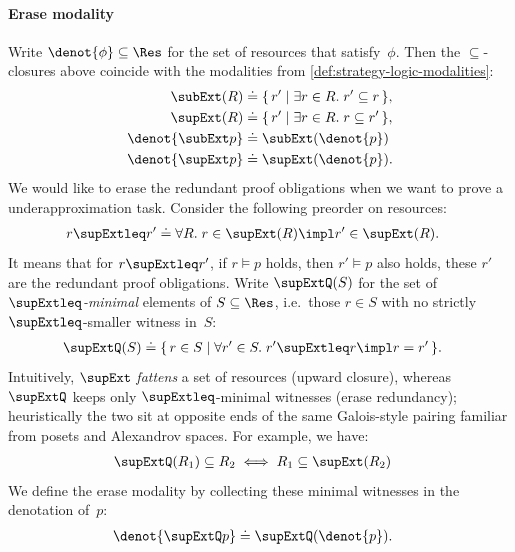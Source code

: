\paragraph{Erase modality}
Write $\denot{\phi} \subseteq \Res$ for the set of resources that satisfy~$\phi$.
Then the $\subseteq$-closures above coincide with the modalities from \autoref{def:strategy-logic-modalities}:
\begin{align*}
  \subExt(R) &\doteq \{\, r' \mid \exists r \in R.\; r' \subseteq r \,\},
  \\
  \supExt(R) &\doteq \{\, r' \mid \exists r \in R.\; r \subseteq r' \,\},
  \\
  \denot{\subExt p} &\doteq \subExt(\denot{p}) \\
  \denot{\supExt p} &\doteq \supExt(\denot{p}).
\end{align*}
We would like to erase the redundant proof obligations when we want to prove a underapproximation task.
Consider the following preorder on resources:
\begin{align*}
  r \supExtleq r' &\doteq \forall R.\; r \in \supExt(R) \impl r' \in \supExt(R).
\end{align*}
It means that for $r \supExtleq r'$, if $r \models p$ holds, then $r' \models p$ also holds, these $r'$ are the redundant proof obligations.
Write $\supExtQ(S)$ for the set of \emph{$\supExtleq$-minimal} elements of $S \subseteq \Res$, i.e.\ those $r \in S$ with no strictly $\supExtleq$-smaller witness in~$S$:
\begin{align*}
  \supExtQ(S) &\doteq
  \{\, r \in S \mid \forall r' \in S.\; r' \supExtleq r \impl r = r' \,\}.
\end{align*}
Intuitively, $\supExt$ \emph{fattens} a set of resources (upward closure), whereas $\supExtQ$ keeps only $\supExtleq$-minimal witnesses (erase redundancy); heuristically the two sit at opposite ends of the same Galois-style pairing familiar from posets and Alexandrov spaces. For example, we have:
\begin{align*}
  &\supExtQ(R_1) \subseteq R_2 \iff R_1 \subseteq \supExt(R_2)
\end{align*}\noindent
We define the erase modality by collecting these minimal witnesses in the denotation of~$p$:
\begin{align*}
  \denot{\supExtQ p} &\doteq \supExtQ(\denot{p}).
\end{align*}
